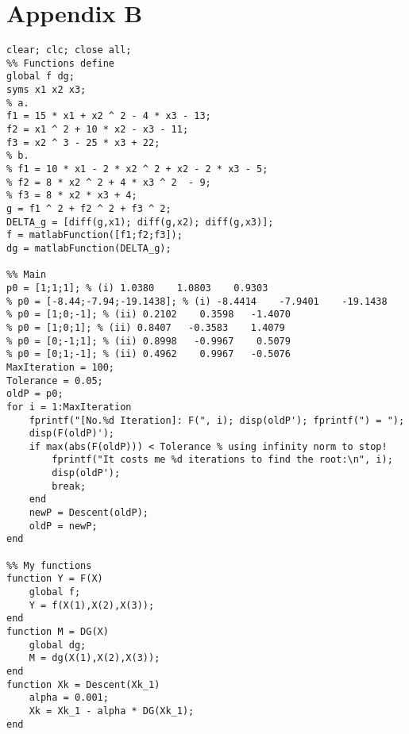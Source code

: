 \documentclass{article}
\begin{document}
\section{Appendix B}
\begin{lstlisting}
clear; clc; close all;
%% Functions define
global f dg;
syms x1 x2 x3; 
% a.
f1 = 15 * x1 + x2 ^ 2 - 4 * x3 - 13; 
f2 = x1 ^ 2 + 10 * x2 - x3 - 11;
f3 = x2 ^ 3 - 25 * x3 + 22;
% b.
% f1 = 10 * x1 - 2 * x2 ^ 2 + x2 - 2 * x3 - 5;
% f2 = 8 * x2 ^ 2 + 4 * x3 ^ 2  - 9;
% f3 = 8 * x2 * x3 + 4;
g = f1 ^ 2 + f2 ^ 2 + f3 ^ 2;
DELTA_g = [diff(g,x1); diff(g,x2); diff(g,x3)];
f = matlabFunction([f1;f2;f3]);
dg = matlabFunction(DELTA_g);

%% Main
p0 = [1;1;1]; % (i) 1.0380    1.0803    0.9303
% p0 = [-8.44;-7.94;-19.1438]; % (i) -8.4414    -7.9401    -19.1438
% p0 = [1;0;-1]; % (ii) 0.2102    0.3598   -1.4070
% p0 = [1;0;1]; % (ii) 0.8407   -0.3583    1.4079
% p0 = [0;-1;1]; % (ii) 0.8998   -0.9967    0.5079
% p0 = [0;1;-1]; % (ii) 0.4962    0.9967   -0.5076
MaxIteration = 100;
Tolerance = 0.05;
oldP = p0;
for i = 1:MaxIteration
    fprintf("[No.%d Iteration]: F(", i); disp(oldP'); fprintf(") = ");
    disp(F(oldP)');
    if max(abs(F(oldP))) < Tolerance % using infinity norm to stop!
        fprintf("It costs me %d iterations to find the root:\n", i);
        disp(oldP');
        break;
    end
    newP = Descent(oldP);
    oldP = newP;
end

%% My functions
function Y = F(X)
    global f;
    Y = f(X(1),X(2),X(3));
end
function M = DG(X)
    global dg;
    M = dg(X(1),X(2),X(3));
end
function Xk = Descent(Xk_1)
    alpha = 0.001;
    Xk = Xk_1 - alpha * DG(Xk_1);
end
\end{lstlisting}
\end{document}
